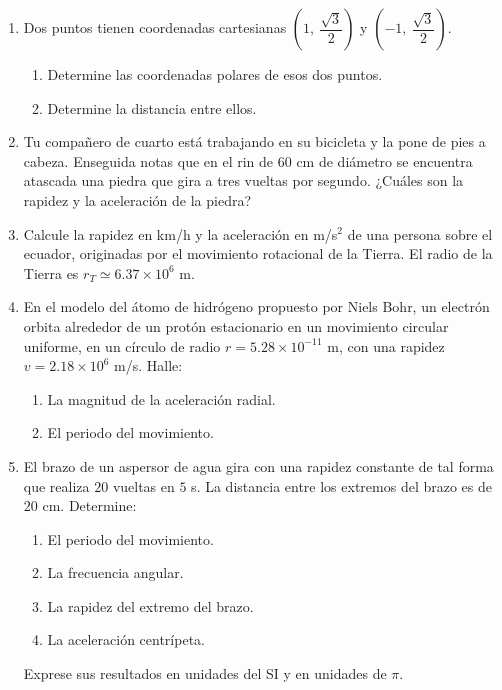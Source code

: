 \documentclass[11pt, letterpaper]{article}
\begin{document}
	\begin{enumerate}[label=\arabic*., leftmargin=*, itemsep=8pt]
		
		\item Dos puntos tienen coordenadas cartesianas $\left(1,\ \dfrac{\sqrt{3}}{2}\right)$ y $\left(-1,\ \dfrac{\sqrt{3}}{2}\right)$.
		\begin{enumerate}[label=\alph*)]
			\item Determine las coordenadas polares de esos dos puntos.
			\item Determine la distancia entre ellos.
		\end{enumerate}
		
		\item Tu compañero de cuarto está trabajando en su bicicleta y la pone de pies a cabeza. Enseguida notas que en el rin de $60$ cm de diámetro se encuentra atascada una piedra que gira a tres vueltas por segundo. ¿Cuáles son la rapidez y la aceleración de la piedra?
		
		\item Calcule la rapidez en km/h y la aceleración en m/s$^2$ de una persona sobre el ecuador, originadas por el movimiento rotacional de la Tierra. El radio de la Tierra es $r_T \simeq 6.37\times10^{6}$ m.
		
		\item En el modelo del átomo de hidrógeno propuesto por Niels Bohr, un electrón orbita alrededor de un protón estacionario en un movimiento circular uniforme, en un círculo de radio $r = 5.28\times10^{-11}$ m, con una rapidez $v = 2.18\times10^{6}$ m/s. Halle:
		\begin{enumerate}[label=\alph*)]
			\item La magnitud de la aceleración radial.
			\item El periodo del movimiento.
		\end{enumerate}
		
		\item El brazo de un aspersor de agua gira con una rapidez constante de tal forma que realiza $20$ vueltas en $5$ s. La distancia entre los extremos del brazo es de $20$ cm. Determine:
		\begin{enumerate}[label=\alph*)]
			\item El periodo del movimiento.
			\item La frecuencia angular.
			\item La rapidez del extremo del brazo.
			\item La aceleración centrípeta.
		\end{enumerate}
		Exprese sus resultados en unidades del SI y en unidades de $\pi$.
		

\end{enumerate}
\end{document}
